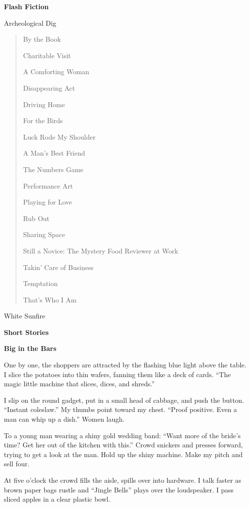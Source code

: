 \documentclass[
]{article}
\begin{document}
\textbf{Flash Fiction}

Archeological Dig

\begin{quote}
By the Book

Charitable Visit

A Comforting Woman

Disappearing Act

Driving Home

For the Birds

Luck Rode My Shoulder

A Man's Best Friend

The Numbers Game

Performance Art

Playing for Love

Rub Out

Sharing Space

Still a Novice: The Mystery Food Reviewer at Work

Takin' Care of Business

Temptation

That's Who I Am
\end{quote}

White Sunfire

\textbf{\hfill\break
}

\textbf{Short Stories}

\textbf{\hfill\break
}

\textbf{\hfill\break
}

\textbf{Big in the Bars}

One by one, the shoppers are attracted by the flashing blue light above
the table. I slice the potatoes into thin wafers, fanning them like a
deck of cards. ``The magic little machine that slices, dices, and
shreds.''

I slip on the round gadget, put in a small head of cabbage, and push the
button. ``Instant coleslaw.'' My thumbs point toward my chest. ``Proof
positive. Even a man can whip up a dish.'' Women laugh.

To a young man wearing a shiny gold wedding band: ``Want more of the
bride's time? Get her out of the kitchen with this.'' Crowd snickers and
presses forward, trying to get a look at the man. Hold up the shiny
machine. Make my pitch and sell four.

At five o'clock the crowd fills the aisle, spills over into hardware. I
talk faster as brown paper bags rustle and ``Jingle Bells'' plays over
the loudspeaker. I pass sliced apples in a clear plastic bowl.
\end{document}
